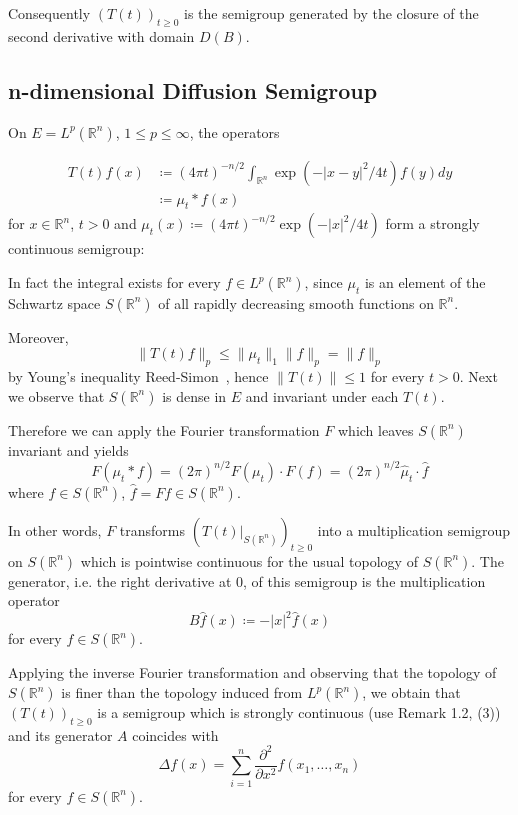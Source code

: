 Consequently $(T(t))_{t \geq 0}$ is the semigroup generated by the closure of the second derivative with domain $D(B)$.

\subsection{n-dimensional Diffusion Semigroup}\label{subsec:a1-2.8}
On $E = L^{p}(\mathbb{R}^{n})$, $1 \leq p \leq \infty$, the operators

\begin{align*}
    T(t)f(x) &\coloneqq (4\pi t)^{-n/2} \int_{\mathbb{R}^{n}} \exp(-|x-y|^{2}/4t)f(y)dy \\
    &\coloneqq \mu_{t}*f(x)
\end{align*}
for $x \in \mathbb{R}^{n}$, $t > 0$ and $\mu_{t}(x) \coloneqq (4\pi t)^{-n/2} \exp(-|x|^{2}/4t)$ form a strongly continuous semigroup:

In fact the integral exists for every $f \in L^{p}(\mathbb{R}^{n})$, since $\mu_{t}$ is an element of the Schwartz space $S(\mathbb{R}^{n})$ of all rapidly decreasing smooth functions on $\mathbb{R}^{n}$.

Moreover,
\[
    \|T(t)f\|_{p} \leq \|\mu_{t}\|_{1}\|f\|_{p} = \|f\|_{p}
\]
by Young's inequality Reed-Simon~\cite[p.28]{reedsimon:1975}, hence $\|T(t)\| \leq 1$ for every $t > 0$.
Next we observe that $S(\mathbb{R}^{n})$ is dense in $E$ and invariant under each $T(t)$.


\newpage
Therefore we can apply the Fourier transformation $F$ which leaves $S(\mathbb{R}^{n})$ invariant and yields
\[
    F(\mu_{t}*f) = (2\pi)^{n/2} F(\mu_{t}) \cdot F(f) = (2\pi)^{n/2} \hat{\mu}_{t}\cdot\hat{f}
\]
where $f \in S(\mathbb{R}^{n})$, $\hat{f} = Ff \in S(\mathbb{R}^{n})$.

In other words, $F$ transforms $(T(t)|_{S(\mathbb{R}^{n})})_{t \geq 0}$ into a multiplication semigroup on $S(\mathbb{R}^{n})$ which is pointwise continuous for the usual topology of $S(\mathbb{R}^{n})$.
The generator, i.e. the right derivative at $0$, of this semigroup is the multiplication operator
\[
    B\hat{f}(x) \coloneqq -|x|^{2}\hat{f}(x)
\]
for every $f \in S(\mathbb{R}^{n})$.

Applying the inverse Fourier transformation and observing that the topology of $S(\mathbb{R}^{n})$ is finer than the topology induced from $L^{p}(\mathbb{R}^{n})$, we obtain that $(T(t))_{t \geq 0}$ is a semigroup which is strongly continuous (use Remark 1.2, (3)) and its generator $A$ coincides with
\[
    \Delta f(x) = \sum_{i=1}^{n} \frac{\partial^{2}}{\partial x^{2}} f(x_{1},\ldots,x_{n})
\]
for every $f \in S(\mathbb{R}^{n})$.

